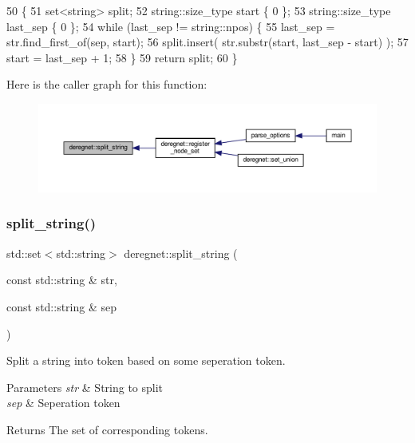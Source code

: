 \begin{DoxyCode}
50                                             \{
51     set<string> split;
52     string::size\_type start \{ 0 \};
53     string::size\_type last\_sep \{ 0 \};
54     \textcolor{keywordflow}{while} (last\_sep != string::npos) \{
55         last\_sep = str.find\_first\_of(sep, start);
56         split.insert( str.substr(start, last\_sep - start) );
57         start = last\_sep + 1;
58     \}
59     \textcolor{keywordflow}{return} split;
60 \}
\end{DoxyCode}
Here is the caller graph for this function\+:\nopagebreak
\begin{figure}[H]
\begin{center}
\leavevmode
\includegraphics[width=350pt]{namespacederegnet_aa12afb18c8703a823fee68c5b9a04bca_icgraph}
\end{center}
\end{figure}
\mbox{\label{namespacederegnet_ae4879ebf699f46d51e52b95f1e6f79da}} 
\subsubsection{\texorpdfstring{split\+\_\+string()}{split\_string()}\hspace{0.1cm}{\footnotesize\ttfamily [2/2]}}
{\footnotesize\ttfamily std\+::set$<$std\+::string$>$ deregnet\+::split\+\_\+string (\begin{DoxyParamCaption}\item[{const std\+::string \&}]{str,  }\item[{const std\+::string \&}]{sep }\end{DoxyParamCaption})}



Split a string into token based on some seperation token. 


\begin{DoxyParams}{Parameters}
{\em str} & String to split \\
\hline
{\em sep} & Seperation token\\
\hline
\end{DoxyParams}
\begin{DoxyReturn}{Returns}
The set of corresponding tokens. 
\end{DoxyReturn}
\mbox{\label{namespacederegnet_a57ac2e918179ec5c93f20248daf39b04}} 
